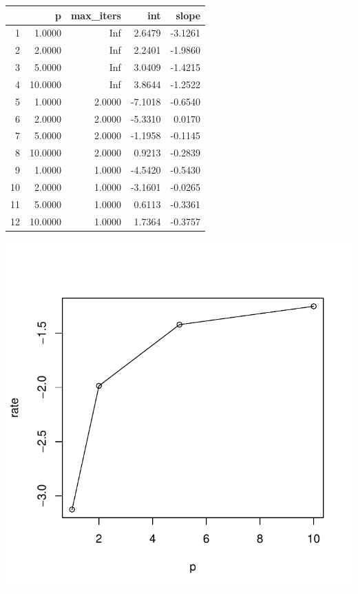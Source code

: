 \documentclass{article}\usepackage[]{graphicx}\usepackage[]{color}
\makeatletter
\def\maxwidth{ %
  \ifdim\Gin@nat@width>\linewidth
    \linewidth
  \else
    \Gin@nat@width
  \fi
}
\makeatother
\begin{document}
\begin{table}[ht]
\centering
\begin{tabular}{rrrrr}
  \hline
 & p & max\_iters & int & slope \\ 
  \hline
1 & 1.0000 &   Inf & 2.6479 & -3.1261 \\ 
  2 & 2.0000 &   Inf & 2.2401 & -1.9860 \\ 
  3 & 5.0000 &   Inf & 3.0409 & -1.4215 \\ 
  4 & 10.0000 &   Inf & 3.8644 & -1.2522 \\ 
  5 & 1.0000 & 2.0000 & -7.1018 & -0.6540 \\ 
  6 & 2.0000 & 2.0000 & -5.3310 & 0.0170 \\ 
  7 & 5.0000 & 2.0000 & -1.1958 & -0.1145 \\ 
  8 & 10.0000 & 2.0000 & 0.9213 & -0.2839 \\ 
  9 & 1.0000 & 1.0000 & -4.5420 & -0.5430 \\ 
  10 & 2.0000 & 1.0000 & -3.1601 & -0.0265 \\ 
  11 & 5.0000 & 1.0000 & 0.6113 & -0.3361 \\ 
  12 & 10.0000 & 1.0000 & 1.7364 & -0.3757 \\ 
   \hline
\end{tabular}
\end{table}

\includegraphics[width=\maxwidth]{figure/results_table} 
\end{document}
